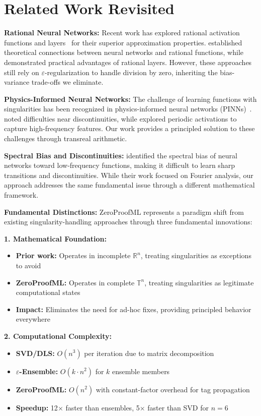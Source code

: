 \documentclass[twoside,11pt]{article}
\newcommand{\TR}{\mathbb{T}}
\begin{document}
\section{Related Work Revisited}

\textbf{Rational Neural Networks:}
Recent work has explored rational activation functions and layers~\citep{boulle2020rational} for their superior approximation properties. \citet{telgarsky2017neural} established theoretical connections between neural networks and rational functions, while \citet{boulle2020rational} demonstrated practical advantages of rational layers. However, these approaches still rely on $\varepsilon$-regularization to handle division by zero, inheriting the bias-variance trade-offs we eliminate.

\textbf{Physics-Informed Neural Networks:}
The challenge of learning functions with singularities has been recognized in physics-informed neural networks (PINNs)~\citep{wang2021understanding,krishnapriyan2021characterizing}. \citet{jagtap2020conservative} noted difficulties near discontinuities, while \citet{sitzmann2020implicit} explored periodic activations to capture high-frequency features. Our work provides a principled solution to these challenges through transreal arithmetic.

\textbf{Spectral Bias and Discontinuities:}
\citet{rahaman2019spectral} identified the spectral bias of neural networks toward low-frequency functions, making it difficult to learn sharp transitions and discontinuities. While their work focused on Fourier analysis, our approach addresses the same fundamental issue through a different mathematical framework.

\textbf{Fundamental Distinctions:}
ZeroProofML represents a paradigm shift from existing singularity-handling approaches through three fundamental innovations:

\textbf{1. Mathematical Foundation:}
\begin{itemize}
\item \textbf{Prior work:} Operates in incomplete $\mathbb{R}^n$, treating singularities as exceptions to avoid
\item \textbf{ZeroProofML:} Operates in complete $\TR^n$, treating singularities as legitimate computational states
\item \textbf{Impact:} Eliminates the need for ad-hoc fixes, providing principled behavior everywhere
\end{itemize}

\textbf{2. Computational Complexity:}
\begin{itemize}
\item \textbf{SVD/DLS:} $O(n^3)$ per iteration due to matrix decomposition
\item \textbf{$\varepsilon$-Ensemble:} $O(k \cdot n^2)$ for $k$ ensemble members
\item \textbf{ZeroProofML:} $O(n^2)$ with constant-factor overhead for tag propagation
\item \textbf{Speedup:} 12$\times$ faster than ensembles, 5$\times$ faster than SVD for $n=6$
\end{itemize}
\end{document}
